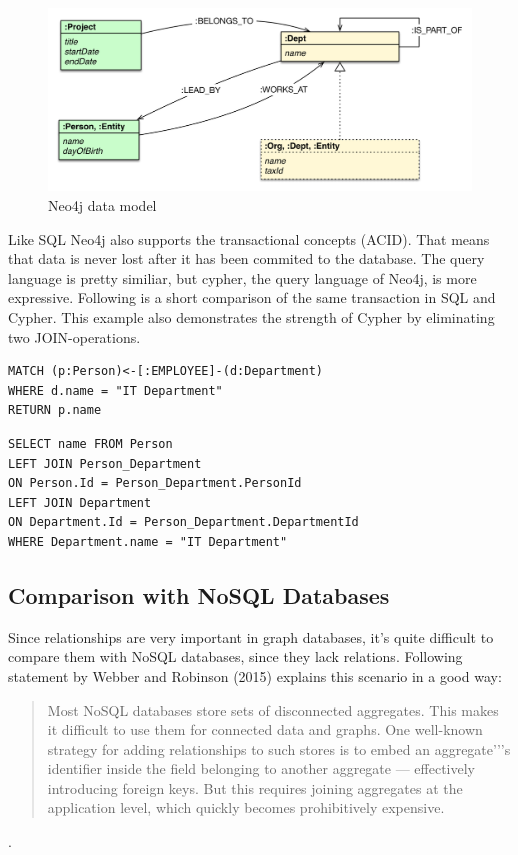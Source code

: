 \begin{figure}[H]
	\includegraphics[width=\linewidth,keepaspectratio]{images/neo4j/organization_graph.png}
	\caption{Neo4j data model}
\end{figure}

Like SQL Neo4j also supports the transactional concepts (ACID). That means that data is never lost after it has been commited to the database.
The query language is pretty similiar, but cypher, the query language of Neo4j, is more expressive.
Following is a short comparison of the same transaction in SQL and Cypher. This example also demonstrates the strength of Cypher by eliminating two JOIN-operations.

\begin{lstlisting}[frame=single, caption=Cypher Statement, label=gcystm]
MATCH (p:Person)<-[:EMPLOYEE]-(d:Department)
WHERE d.name = "IT Department"
RETURN p.name
\end{lstlisting}

\begin{lstlisting}[frame=single, caption=SQL Statement, label=gsqlstm]
SELECT name FROM Person
LEFT JOIN Person_Department
ON Person.Id = Person_Department.PersonId
LEFT JOIN Department
ON Department.Id = Person_Department.DepartmentId
WHERE Department.name = "IT Department"
\end{lstlisting}

\subsection{Comparison with NoSQL Databases}

Since relationships are very important in graph databases, it's quite difficult to compare them with NoSQL databases, since they lack relations. Following statement by Webber and Robinson (2015) explains this scenario in a good way:
\begin{quotation}
	Most NoSQL databases store sets of disconnected aggregates. This makes it difficult to use them for connected data and graphs.
	One well-known strategy for adding relationships to such stores is to embed an aggregate'’'s identifier inside the field belonging to another aggregate — effectively introducing foreign keys.
	But this requires joining aggregates at the application level, which quickly becomes prohibitively expensive.
\end{quotation} \cite[p. 15]{Webber.Robinson.2015}.

